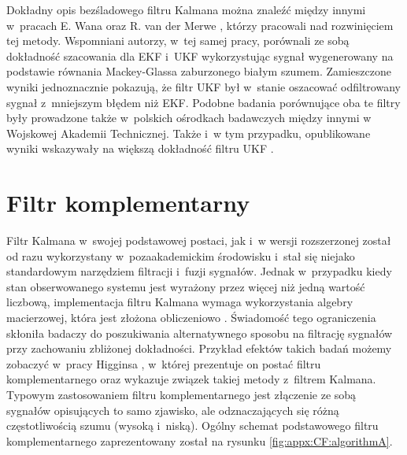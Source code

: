 		
Dokładny opis bezśladowego filtru Kalmana można znaleźć między innymi w~pracach E. Wana oraz R. van der Merwe \cite{Wan2000, Wan2001}, którzy pracowali nad rozwinięciem tej metody. Wspomniani autorzy, w~tej samej pracy, porównali ze sobą dokładność szacowania dla EKF i~UKF wykorzystując sygnał wygenerowany na podstawie równania Mackey-Glassa \cite{Glass2010} zaburzonego białym szumem. Zamieszczone wyniki jednoznacznie pokazują, że filtr UKF był w~stanie oszacować odfiltrowany sygnał z~mniejszym błędem niż EKF. Podobne badania porównujące oba te filtry były prowadzone także w~polskich ośrodkach badawczych między innymi w Wojskowej Akademii Technicznej. Także i~w tym przypadku, opublikowane wyniki wskazywały na większą dokładność filtru UKF \cite{Konatowski2007, Konatowski2007a}.
		
\section*{Filtr komplementarny}\label{sec:appx:filters:CF}
Filtr Kalmana w~swojej podstawowej postaci, jak i~w wersji rozszerzonej został od razu wykorzystany w~pozaakademickim środowisku i~stał się niejako standardowym narzędziem filtracji i~fuzji sygnałów. Jednak w~przypadku kiedy stan obserwowanego systemu jest wyrażony przez więcej niż jedną wartość liczbową, implementacja filtru Kalmana wymaga wykorzystania algebry macierzowej, która jest złożona obliczeniowo \cite{wiki:MatrixAlgebraComplexity2016}. Świadomość tego ograniczenia skłoniła badaczy do poszukiwania alternatywnego sposobu na filtrację sygnałów przy zachowaniu zbliżonej dokładności. Przykład efektów takich badań możemy zobaczyć w~pracy Higginsa \cite{Higgins1975}, w~której prezentuje on postać filtru komplementarnego oraz wykazuje związek takiej metody z~filtrem Kalmana. Typowym zastosowaniem filtru komplementarnego jest złączenie ze sobą sygnałów opisujących to samo zjawisko, ale odznaczających się różną częstotliwością szumu (wysoką i~niską). Ogólny schemat podstawowego filtru komplementarnego zaprezentowany został na rysunku \ref{fig:appx:CF:algorithmA}.
		
\newcommand{\suma}{\Large$+$}
\newcommand{\inte}{$\displaystyle \int$}
\newcommand{\derv}{\huge$\frac{d}{dt}$}
		

